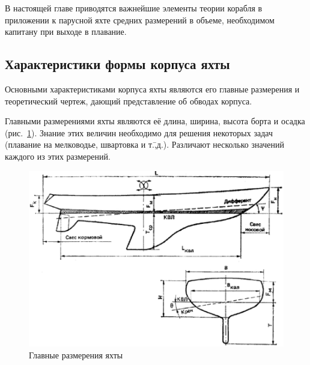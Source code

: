 \documentclass[a4paper, 12pt, twoside, final, book, russian, fittopage, cyremdash]{ncc}
\begin{document}
В настоящей главе приводятся важнейшие элементы теории корабля в приложении к парусной яхте средних размерений в объеме, необходимом капитану при выходе в плавание.

\subsection{Характеристики формы корпуса яхты}

Основными характеристиками корпуса яхты являются его главные размерения и теоретический чертеж, дающий представление об обводах корпуса.

Главными размерениями яхты являются её длина, ширина, высота борта и осадка (рис.~\ref{fig:1}). Знание этих величин необходимо для решения некоторых задач (плавание на мелководье, швартовка и т.\=,д.). Различают несколько значений каждого из этих размерений.

\begin{figure}[hbt]
   \centering
   \includegraphics[scale=0.5]{0001_Glavnye_razmereniya_yakhty.jpg}
   \caption{Главные размерения яхты}
   \label{fig:1}
\end{figure}
\end{document}
